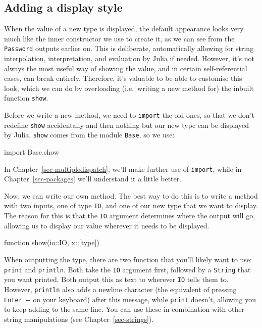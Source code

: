 \documentclass[
  letterpaper,
  DIV=11,
  numbers=noendperiod]{scrreprt}
\newenvironment{Shaded}{\begin{snugshade}}{\end{snugshade}}
\newcommand{\BuiltInTok}[1]{\textcolor[rgb]{0.00,0.23,0.31}{#1}}
\newcommand{\DataTypeTok}[1]{\textcolor[rgb]{0.68,0.00,0.00}{#1}}
\newcommand{\FunctionTok}[1]{\textcolor[rgb]{0.28,0.35,0.67}{#1}}
\newcommand{\ImportTok}[1]{\textcolor[rgb]{0.00,0.46,0.62}{#1}}
\newcommand{\KeywordTok}[1]{\textcolor[rgb]{0.00,0.23,0.31}{#1}}
\newcommand{\NormalTok}[1]{\textcolor[rgb]{0.00,0.23,0.31}{#1}}
\newcommand{\OperatorTok}[1]{\textcolor[rgb]{0.37,0.37,0.37}{#1}}
\begin{document}
\hypertarget{adding-a-display-style}{%
\subsection{Adding a display style}\label{adding-a-display-style}}

When the value of a new type is displayed, the default appearance looks
very much like the inner constructor we use to create it, as we can see
from the \texttt{Password} outputs earlier on. This is deliberate,
automatically allowing for string interpolation, interpretation, and
evaluation by Julia if needed. However, it's not always the most useful
way of showing the value, and in certain self-referential cases, can
break entirely. Therefore, it's valuable to be able to customise this
look, which we can do by overloading (i.e.~writing a new method for) the
inbuilt function \texttt{show}.

Before we write a new method, we need to \texttt{import} the old ones,
so that we don't redefine \texttt{show} accidentally and then nothing
but our new type can be displayed by Julia. \texttt{show} comes from the
module \texttt{Base}, so we use:

\begin{Shaded}
\begin{Highlighting}[]
\ImportTok{import} \BuiltInTok{Base.show}
\end{Highlighting}
\end{Shaded}

In Chapter~\ref{sec-multipledispatch}, we'll make further use of
\texttt{import}, while in Chapter~\ref{sec-packages} we'll understand it
a little better.

Now, we can write our own method. The best way to do this is to write a
method with two inputs, one of type \texttt{IO}, and one of our new type
that we want to display. The reason for this is that the \texttt{IO}
argument determines where the output will go, allowing us to display our
value wherever it needs to be displayed.

\begin{Shaded}
\begin{Highlighting}[]
\KeywordTok{function} \FunctionTok{show}\NormalTok{(io}\OperatorTok{::}\DataTypeTok{IO}\NormalTok{, x}\OperatorTok{::}\DataTypeTok{[type}\NormalTok{])}
\end{Highlighting}
\end{Shaded}

When outputting the type, there are two function that you'll likely want
to use: \texttt{print} and \texttt{println}. Both take the \texttt{IO}
argument first, followed by a \texttt{String} that you want printed.
Both output this as text to wherever \texttt{IO} tells them to. However,
\texttt{println} also adds a newline character (the equivalent of
pressing \texttt{Enter\ ⮠} on your keyboard) after this message, while
\texttt{print} doesn't, allowing you to keep adding to the same line.
You can use these in combination with other string manipulations (see
Chapter~\ref{sec-strings}).
\end{document}
